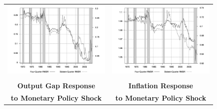 \documentclass[12pt]{article}
\begin{document}
{\begin{figure}
\begin{tabular}{cc}
\includegraphics[scale=0.17]{images/RMS16_Output_Gap_Cost_Shock.png} & \includegraphics[scale=0.17]{images/RMS16_Inflation_Cost_Shock.png} \\\\
\textbf{Output Gap Response} & \textbf{Inflation Response} \\
\textbf{to Monetary Policy Shock} & \textbf{to Monetary Policy Shock}  \\

\end{tabular}
\end{figure}}
\end{document}
